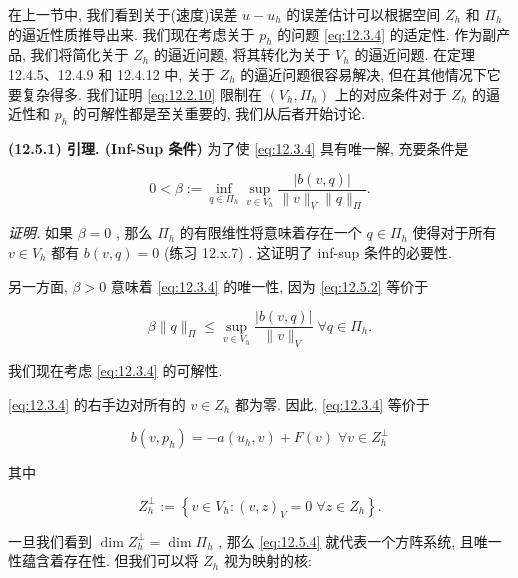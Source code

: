 在上一节中, 我们看到关于(速度)误差 $u - {u}_{h}$ 的误差估计可以根据空间 ${Z}_{h}$ 和 ${\varPi }_{h}$ 的逼近性质推导出来. 我们现在考虑关于 ${p}_{h}$ 的问题 \eqref{eq:12.3.4} 的适定性. 作为副产品, 我们将简化关于 ${Z}_{h}$ 的逼近问题, 将其转化为关于 ${V}_{h}$ 的逼近问题. 在定理 12.4.5、12.4.9 和 12.4.12 中, 关于 ${Z}_{h}$ 的逼近问题很容易解决, 但在其他情况下它要复杂得多. 我们证明 \eqref{eq:12.2.10} 限制在 $\left( {{V}_{h},{\varPi }_{h}}\right)$ 上的对应条件对于 ${Z}_{h}$ 的逼近性和 ${p}_{h}$ 的可解性都是至关重要的, 我们从后者开始讨论.

\textbf{(12.5.1) 引理. (Inf-Sup 条件)} 为了使 \eqref{eq:12.3.4} 具有唯一解, 充要条件是

\begin{equation}\label{eq:12.5.2}
0 < \beta :=\mathop{\inf }\limits_{{q \in  {\varPi }_{h}}}\mathop{\sup }\limits_{{v \in  {V}_{h}}}\frac{\left| b\left( v,q\right) \right| }{\| v\|_{V}\| q\|_{\varPi }}.
\end{equation}

\textit{证明.} 如果 $\beta  = 0$ , 那么 ${\varPi }_{h}$ 的有限维性将意味着存在一个 $q \in  {\varPi }_{h}$ 使得对于所有 $v \in  {V}_{h}$ 都有 $b\left( {v,q}\right)  = 0$ (练习 12.x.7) . 这证明了 inf-sup 条件的必要性.

另一方面, $\beta  > 0$ 意味着 \eqref{eq:12.3.4} 的唯一性, 因为 \eqref{eq:12.5.2} 等价于

\begin{equation}\label{eq:12.5.3}
\beta \| q\|_{\varPi } \leq  \mathop{\sup }\limits_{{v \in  {V}_{h}}}\frac{\left| b\left( v,q\right) \right| }{\| v\|_{V}}\;\forall q \in  {\varPi }_{h}.
\end{equation}

我们现在考虑 \eqref{eq:12.3.4} 的可解性.

\eqref{eq:12.3.4} 的右手边对所有的 $v \in  {Z}_{h}$ 都为零. 因此, \eqref{eq:12.3.4} 等价于

\begin{equation}\label{eq:12.5.4}
b\left( {v,{p}_{h}}\right)  =  - a\left( {{u}_{h},v}\right)  + F\left( v\right) \;\forall v \in  {Z}_{h}^{ \bot  }
\end{equation}

其中

\begin{equation}\label{eq:12.5.5}
{Z}_{h}^{ \bot  }:=\left\{  {v \in  {V}_{h} : {\left( v,z\right) }_{V} = 0\;\forall z \in  {Z}_{h}}\right\}  .
\end{equation}

一旦我们看到 $\dim {Z}_{h}^{ \bot  } = \dim {\varPi }_{h}$ , 那么 \eqref{eq:12.5.4} 就代表一个方阵系统, 且唯一性蕴含着存在性. 但我们可以将 ${Z}_{h}$ 视为映射的核:

